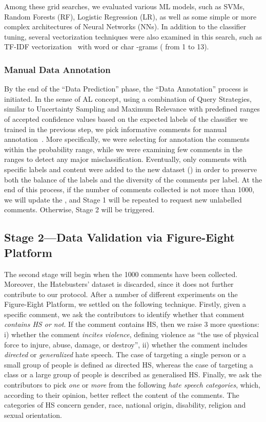 \documentclass[sigconf]{acmart}
\begin{document}
Among these grid searches, we evaluated various ML models, such as SVMs, Random Forests (RF), Logistic Regression (LR), as well as some simple or more complex architectures of Neural Networks (NNs). In addition to the classifier tuning, several vectorization techniques were also examined in this search, such as TF-IDF vectorization~\cite{TFIDFVec} with word or char -grams ( from 1 to 13).

\subsubsection{Manual Data Annotation} 
By the end of the ``Data Prediction'' phase, the ``Data Annotation'' process is initiated. In the sense of AL concept, using a combination of Query Strategies, similar to Uncertainty Sampling and Maximum Relevance with predefined ranges of accepted confidence values based on the expected labels of the classifier we trained in the previous step, we pick informative comments for manual annotation~\cite{DBLP:journals/kbs/PupoAV18}. More specifically, we were selecting for annotation the comments within the  probability range, while we were examining few comments in the ranges  to detect any major misclassification. Eventually, only comments with specific labels and content were added to the new dataset () in order to preserve both the balance of the labels and the diversity of the comments per label. At the end of this process, if the number of comments collected is not more than 1000, we will update the , and Stage 1 will be repeated to request new unlabelled comments. Otherwise, Stage 2 will be triggered.

\subsection{Stage 2---Data Validation via Figure-Eight Platform}
The second stage will begin when the 1000 comments have been collected. Moreover, the Hatebusters' dataset is discarded, since it does not further contribute to our protocol. After a number of different experiments on the Figure-Eight Platform, we settled on the following technique.
Firstly, given a specific comment, we ask the contributors to identify whether that comment \textit{contains HS or not}. If the comment contains HS, then we raise 3 more questions: i) whether the comment \textit{incites violence}, defining violence as ``the use of physical force to injure, abuse, damage, or destroy'', ii) whether the comment includes \textit{directed} or \textit{generalized} hate speech. The case of targeting a single person or a small group of people is defined as directed HS, whereas the case of targeting a class or a large group of people is described as generalised HS. Finally, we ask the contributors to pick \textit{one} or \textit{more} from the following \textit{hate speech categories}, which, according to their opinion, better reflect the content of the comments. The categories of HS concern gender, race, national origin, disability, religion and sexual orientation.
\end{document}
